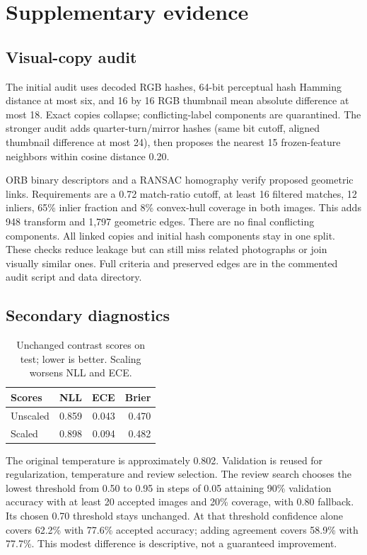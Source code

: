 \section{Supplementary evidence}
\subsection{Visual-copy audit}\label{app:audit}
The initial audit uses decoded RGB hashes, 64-bit perceptual hash Hamming distance at most six, and 16 by 16 RGB thumbnail mean absolute difference at most 18. Exact copies collapse; conflicting-label components are quarantined. The stronger audit adds quarter-turn/mirror hashes (same bit cutoff, aligned thumbnail difference at most 24), then proposes the nearest 15 frozen-feature neighbors within cosine distance 0.20.

ORB binary descriptors and a RANSAC homography verify proposed geometric links. Requirements are a 0.72 match-ratio cutoff, at least 16 filtered matches, 12 inliers, 65\% inlier fraction and 8\% convex-hull coverage in both images. This adds 948 transform and 1,797 geometric edges. There are no final conflicting components. All linked copies and initial hash components stay in one split. These checks reduce leakage but can still miss related photographs or join visually similar ones. Full criteria and preserved edges are in the commented audit script and data directory.

\subsection{Secondary diagnostics}\label{app:secondary}
\begin{table}[h]
\centering\small
\begin{tabular}{lrrr}
\toprule
Scores & NLL & ECE & Brier \\
\midrule
Unscaled & 0.859 & 0.043 & 0.470 \\
Scaled & 0.898 & 0.094 & 0.482 \\
\bottomrule
\end{tabular}
\caption{Unchanged contrast scores on test; lower is better. Scaling worsens NLL and ECE.}
\label{tab:calibration}
\end{table}

The original temperature is approximately 0.802. Validation is reused for regularization, temperature and review selection. The review search chooses the lowest threshold from 0.50 to 0.95 in steps of 0.05 attaining 90\% validation accuracy with at least 20 accepted images and 20\% coverage, with 0.80 fallback. Its chosen 0.70 threshold stays unchanged. At that threshold confidence alone covers 62.2\% with 77.6\% accepted accuracy; adding agreement covers 58.9\% with 77.7\%. This modest difference is descriptive, not a guaranteed improvement.

